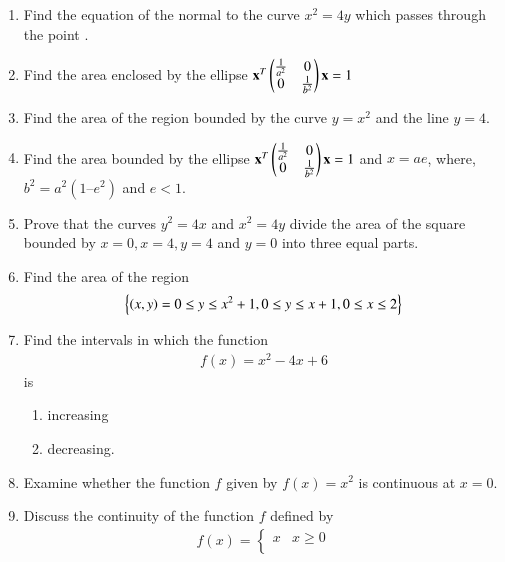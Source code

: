 \begin{enumerate}[label=\arabic*.,ref=\thesubsection.\theenumi]
\begin{enumerate}
\end{enumerate}
 \item Find the equation of the normal to the curve $x^2= 4y$
which passes through the point .
%
\item Find the area enclosed by the ellipse
$
\mathbf{x}^T\begin{pmatrix}\frac{1}{a^2} & 0 \\ 0 & \frac{1}{b^2}\end{pmatrix}\mathbf{x} = 1
$
%
\item Find the area of the region bounded by the curve $y = x^2$
and the line $y = 4$.
%
\item Find the area bounded by the ellipse
$
\mathbf{x}^T\begin{pmatrix}\frac{1}{a^2} & 0 \\ 0 & \frac{1}{b^2}\end{pmatrix}\mathbf{x} = 1
$
and $x = ae$, where, $b^2 = a^2 (1 – e^2 )$ and $e < 1$.
%
\item Prove that the curves $y^2 = 4x$ and $x^2 = 4y$ divide the area of the square bounded by $x = 0, x = 4, y =4$ and $y = 0$ into three equal parts.
%
\item Find the area of the region
\begin{align}
\left\{\left(x,y\right) = 0\le y\le x^2+1, 0\le y \le x+1, 0 \le x \le 2\right\}
\end{align}
\item Find the intervals in which the function 
\begin{align}
f(x)  = x^2-4x+6
\end{align}
%
is 
\begin{enumerate}
\item increasing
\item decreasing.
\end{enumerate}
%
%
%
\item Examine whether the function $f$ given by $f(x) = x^2$ is continuous at $x = 0$.
%
\item Discuss the continuity of the function $f$ defined by 
%
\begin{align}
f(x)  = 
\begin{cases}
x & x \ge 0
\\

\end{cases}
\end{align}
\end{enumerate}
